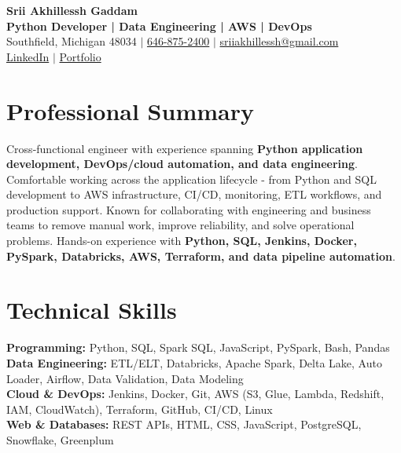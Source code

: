 \documentclass[letterpaper,10pt]{article}
\begin{document}
\fontsize{9.35pt}{10.45pt}\selectfont

\begin{center}
    {\LARGE \textbf{Srii Akhillessh Gaddam}} \\[-1pt]
    \textbf{Python Developer | Data Engineering | AWS | DevOps} \\[2pt]
    Southfield, Michigan 48034 $|$
    \href{tel:6468752400}{646-875-2400} $|$
    \href{mailto:sriiakhillessh@gmail.com}{sriiakhillessh@gmail.com} \\[1pt]
    \href{https://www.linkedin.com/in/srii-akhiilessh-gaddam-b48668191/}{LinkedIn} $|$
    \href{https://sriiakhillesshg.github.io/portfolio/}{Portfolio}
\end{center}
\vspace{-8pt}

\section{Professional Summary}
\small{Cross-functional engineer with experience spanning \textbf{Python application development, DevOps/cloud automation, and data engineering}. Comfortable working across the application lifecycle - from Python and SQL development to AWS infrastructure, CI/CD, monitoring, ETL workflows, and production support. Known for collaborating with engineering and business teams to remove manual work, improve reliability, and solve operational problems. Hands-on experience with \textbf{Python, SQL, Jenkins, Docker, PySpark, Databricks, AWS, Terraform, and data pipeline automation}.}

\section{Technical Skills}
\small{
\textbf{Programming:} Python, SQL, Spark SQL, JavaScript, PySpark, Bash, Pandas \\
\textbf{Data Engineering:} ETL/ELT, Databricks, Apache Spark, Delta Lake, Auto Loader, Airflow, Data Validation, Data Modeling \\
\textbf{Cloud \& DevOps:} Jenkins, Docker, Git, AWS (S3, Glue, Lambda, Redshift, IAM, CloudWatch), Terraform, GitHub, CI/CD, Linux \\
\textbf{Web \& Databases:} REST APIs, HTML, CSS, JavaScript, PostgreSQL, Snowflake, Greenplum
}
\end{document}
